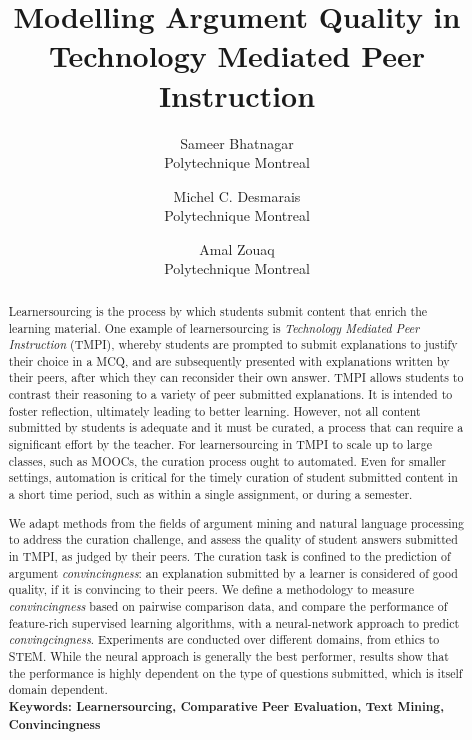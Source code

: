 \documentclass[notitlepage,12pt]{jedm}
\begin{document}
	
	\title{Modelling Argument Quality in Technology Mediated Peer Instruction}
	\date{} %
	
	\author{
		{\large Sameer Bhatnagar}
		\\Polytechnique Montreal
	 	\and 
	 	{\large Michel C. Desmarais}
	 	\\Polytechnique Montreal
	 	\and 
	 	{\large Amal Zouaq}
 		\\Polytechnique Montreal
 }

	
	\maketitle
	
	\begin{abstract}
	Learnersourcing is the process by which students submit content that enrich 
	the learning material.  
	One example of learnersourcing is \textit{Technology Mediated Peer 
	Instruction} (TMPI), whereby students are prompted to submit explanations 
	to justify their choice in a MCQ, and are subsequently presented with 
	explanations written by their peers, after which they can reconsider their 
	own answer.  
	TMPI allows students to contrast their reasoning to a variety of peer 
	submitted explanations. 
	It is intended to foster reflection, ultimately leading to better 
	learning.  
	However, not all content submitted by students is adequate and it must be 
	curated, a process that can require a significant effort by the teacher.  
	For learnersourcing in TMPI to scale up to large classes, such as MOOCs, 
	the curation process ought to automated.  
	Even for smaller settings, automation is critical for the timely curation 
	of student submitted content in a short time period, such as within a 
	single assignment, or during a semester.
	
	We adapt methods from the fields of argument mining and natural language 
	processing to address the curation challenge, and assess the quality of 
	student answers submitted in TMPI, as judged by their peers.  
	The curation task is confined to the prediction of argument 
	\textit{convincingness}: an explanation submitted by a learner is 
	considered of good quality, if it is convincing to their peers.  
	We define a methodology to measure \textit{convincingness} based on 
	pairwise comparison data, and compare the performance of feature-rich 
	supervised learning algorithms, with a neural-network approach to predict 
	\textit{convingcingness}.
	Experiments are conducted over different domains, from ethics to STEM.  
	While the neural approach is generally the best performer, results show 
	that the performance is highly dependent on the type of questions 
	submitted, which is itself domain dependent.
	\\ %
		{\parindent0pt
			\textbf{Keywords: Learnersourcing, Comparative Peer Evaluation, 
			Text Mining, Convincingness} 
		}
	\end{abstract}
\end{document}
